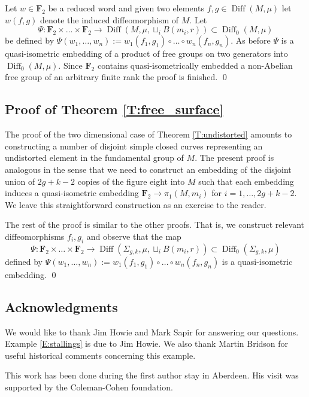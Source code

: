 \documentclass[a4paper,12pt]{amsart}
\def\Diff{\operatorname{Diff}}
\theoremstyle{definition}
\def\B{\mathbf}
\begin{document}
Let $w\in \B F_2$ be a reduced word and given two
elements $f,g\in \Diff(M,\mu)$ let $w(f,g)$ denote
the induced diffeomorphism of $M$.
Let
$$
\Psi\colon \B F_2\times \dots \times \B F_2\to
\Diff(M,\mu,\sqcup_iB(m_i,r))\subset \Diff_0(M,\mu)
$$
be defined by
$
\Psi(w_1,\ldots,w_n):= w_1(f_{1},g_{1})\circ \dots \circ
w_n(f_{n},g_{n})
$.
As before $\Psi$ is a quasi-isometric embedding of
a product of free groups on two generators into
$\Diff_0(M,\mu)$.
Since $\B F_2$ contains quasi-isometrically embedded
a non-Abelian free group of an arbitrary finite
rank \cite{Harpe} the proof is finished.
\qed

\subsection{Proof of Theorem \ref{T:free_surface}} \label{SS:proof_free_surface}

The proof of the two dimensional case
of Theorem \ref{T:undistorted} amounts to constructing
a number of disjoint simple closed curves representing
an undistorted element in the fundamental group of $M$.
The present proof is analogous in the sense that
we need to construct an embedding of the disjoint union
of $2g+k-2$ copies of the figure eight into $M$ such that
each embedding induces a quasi-isometric embedding
$\B F_2\to \pi_1(M,m_i)$ for $i=1,\ldots,2g+k-2$.
We leave this straightforward construction as an
exercise to the reader.

The rest of the proof is similar to the other proofs.
That is, we construct relevant diffeomorphisms $f_i,g_i$
and observe that the map
$$
\Psi\colon \B F_2\times \dots \times \B F_2\to
\Diff(\Sigma_{g,k},\mu,\sqcup_iB(m_i,r))
\subset \Diff_0(\Sigma_{g,k},\mu)
$$
defined by $\Psi(w_1,\ldots,w_n):= w_1(f_{1},g_{1})\circ \dots \circ w_n(f_{n},g_{n})$
is a quasi-isometric embedding.
\qed

\subsection*{Acknowledgments}
We would like to thank Jim Howie and Mark Sapir for answering our
questions. Example \ref{E:stallings} is due to Jim Howie.
We also thank Martin Bridson for useful historical comments concerning
this example.

This work has been done during the first author stay
in Aberdeen. His visit was supported by the Coleman-Cohen foundation.
\end{document}
